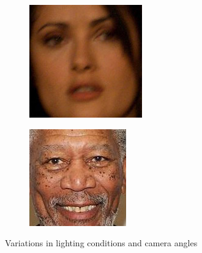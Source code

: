 \documentclass[10pt,twocolumn,letterpaper]{article}
\begin{document}
\begin{figure}[h]
\begin{subfigure}[b]{0.24\linewidth}
        \label{fig:nicole}
    \end{subfigure}
    \hfill
    \begin{subfigure}[b]{0.24\linewidth}
        \includegraphics[width=\linewidth]{images/dataset/Salma_Hayek_184}
        \label{fig:morgan}
    \end{subfigure}
    \hfill
    \begin{subfigure}[b]{0.24\linewidth}
        \includegraphics[width=\linewidth]{images/dataset/Morgan_Freeman_305}
        \label{fig:morgan}
    \end{subfigure}
    \caption{Variations in lighting conditions and camera angles}\label{fig:dataset}
\end{figure}
\end{document}
